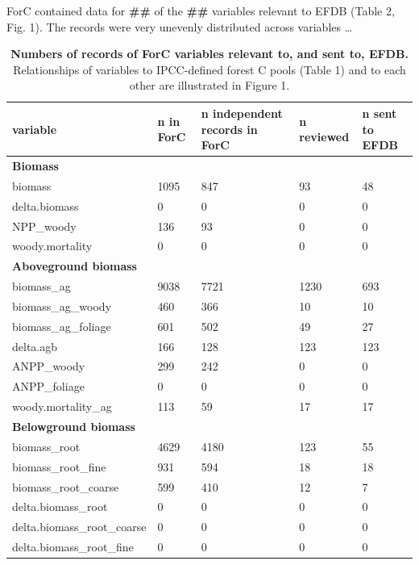\documentclass[, manuscript]{copernicus}
\begin{document}
ForC contained data for \textbf{\#\#} of the \textbf{\#\#} variables
relevant to EFDB (Table 2, Fig. 1). The records were very unevenly
distributed across variables \ldots{}

\begin{longtabu} to 
\caption{\label{tab:table_variables}\textbf{Numbers of records of ForC variables relevant to, and sent to, EFDB.} Relationships of variables to IPCC-defined forest C pools (Table 1) and to each other are illustrated in Figure 1. }\\
\hline
\textbf{variable} & \textbf{n in ForC} & \textbf{n independent records in ForC} & \textbf{n reviewed} & \textbf{n sent to EFDB}\\
\hline
\textbf{Biomass} & \textbf{} & \textbf{} & \textbf{} & \textbf{}\\
\hline
biomass & 1095 & 847 & 93 & 48\\
\hline
delta.biomass & 0 & 0 & 0 & 0\\
\hline
NPP\_woody & 136 & 93 & 0 & 0\\
\hline
woody.mortality & 0 & 0 & 0 & 0\\
\hline
\textbf{Aboveground biomass} & \textbf{} & \textbf{} & \textbf{} & \textbf{}\\
\hline
biomass\_ag & 9038 & 7721 & 1230 & 693\\
\hline
biomass\_ag\_woody & 460 & 366 & 10 & 10\\
\hline
biomass\_ag\_foliage & 601 & 502 & 49 & 27\\
\hline
delta.agb & 166 & 128 & 123 & 123\\
\hline
ANPP\_woody & 299 & 242 & 0 & 0\\
\hline
ANPP\_foliage & 0 & 0 & 0 & 0\\
\hline
woody.mortality\_ag & 113 & 59 & 17 & 17\\
\hline
\textbf{Belowground biomass} & \textbf{} & \textbf{} & \textbf{} & \textbf{}\\
\hline
biomass\_root & 4629 & 4180 & 123 & 55\\
\hline
biomass\_root\_fine & 931 & 594 & 18 & 18\\
\hline
biomass\_root\_coarse & 599 & 410 & 12 & 7\\
\hline
delta.biomass\_root & 0 & 0 & 0 & 0\\
\hline
delta.biomass\_root\_coarse & 0 & 0 & 0 & 0\\
\hline
delta.biomass\_root\_fine & 0 & 0 & 0 & 0\\

\end{longtabu}
\end{document}

